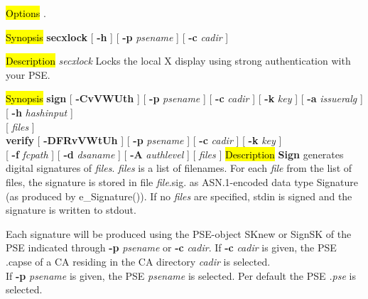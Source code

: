 \hl{Options}
. 


  
 

\label{secxlock}
\hl{Synopsis}
{\bf secxlock} [ {\bf -h} ] [ {\bf -p} {\em psename} ] [ {\bf -c} {\em cadir} ]

\hl{Description}
{\em secxlock}  Locks the local X display using strong authentication with your PSE.

\label{sign}
\hl{Synopsis}
{\bf sign} [ {\bf -CvVWUth} ] [ {\bf -p} {\em psename} ] [ {\bf -c} {\em cadir} ] [ {\bf -k} {\em key} ] [ {\bf 
-a} {\em issueralg} ] [ {\bf -h} {\em hashinput} ]
\\ \hspace *{1cm} 
 [ {\em files} ]
\\
{\bf verify} [ {\bf -DFRvVWtUh} ] [ {\bf -p} {\em psename} ] [ {\bf -c} {\em cadir} ] [ {\bf 
-k} {\em key} ]
\\ \hspace *{1cm} 
[ {\bf -f} {\em fcpath} ] [ {\bf -d} {\em dsaname} ] [ {\bf -A} {\em authlevel} ] [ {\em files} ]
\hl{Description}
{\bf Sign} generates digital signatures of {\em files}. {\em files} is a list of filenames. For each
{\em file} from the list of files, the signature is stored in file {\em file}.sig.
as ASN.1-encoded data type Signature (as produced by e\_Signature()). If no {\em files} are specified, 
stdin is signed and 
the signature is written to stdout. 

Each signature will be produced using the PSE-object SKnew or SignSK
of the PSE indicated through {\bf -p} {\em psename} or {\bf -c} {\em cadir}.
If {\bf -c} {\em cadir} is given, the PSE .capse of a CA residing in the CA directory {\em cadir}
is selected. \\
If {\bf -p} {\em psename} is given, the PSE {\em psename} is selected. Per default the PSE {\em .pse} is 
selected.

